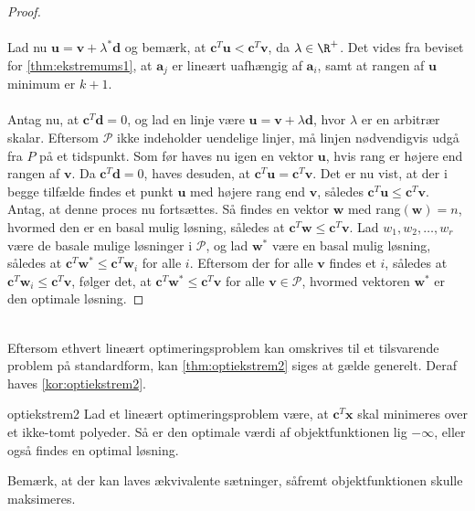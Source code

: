 \begin{proof}
\\\\%
Lad nu $\textbf{u} = \textbf{v} + \lambda^* \textbf{d} $ og bemærk, at $ \textbf{c}^T \textbf{u} < \textbf{c}^T \textbf{v}$, da $ \lambda \in \R^+ $. 
Det vides fra beviset for \ref{thm:ekstremums1}, at $\textbf{a}_j$ er lineært uafhængig af $\textbf{a}_i$, samt at rangen af $\textbf{u}$ minimum er $k + 1$. 
\\\\
%
Antag nu, at $\textbf{c}^T \textbf{d} = 0$, og lad en linje være $\textbf{u} = \textbf{v} + \lambda \textbf{d}$, hvor $ \lambda $ er en arbitrær skalar. 
Eftersom $\mathcal{P}$ ikke indeholder uendelige linjer, må linjen nødvendigvis udgå fra $P$ på et tidspunkt. 
Som før haves nu igen en vektor $\textbf{u}$, hvis rang er højere end rangen af $\textbf{v}$. 
Da $\textbf{c}^T \textbf{d} = 0$, haves desuden, at $\textbf{c}^T \textbf{u} = \textbf{c}^T \textbf{v}$. 
Det er nu vist, at der i begge tilfælde findes et punkt $\textbf{u}$ med højere rang end $\textbf{v}$, således $\textbf{c}^T \textbf{u} \leq \textbf{c}^T \textbf{v}$. 
Antag, at denne proces nu fortsættes.
Så findes en vektor $\textbf{w}$ med rang$(\textbf{w})=n$, hvormed den er en basal mulig løsning, således at $\textbf{c}^T \textbf{w} \leq \textbf{c}^T \textbf{v}$. 
Lad $w_1, w_2, \ldots , w_r$ være de basale mulige løsninger i $\mathcal{P}$, og lad $\textbf{w}^*$ være en basal mulig løsning, således at $\textbf{c}^T \textbf{w}^* \leq \textbf{c}^T \textbf{w}_i$ for alle $i$. 
Eftersom der for alle $\textbf{v}$ findes et $i$, således at $\textbf{c}^T \textbf{w}_i \leq \textbf{c}^T \textbf{v}$, følger det, at $\textbf{c}^T \textbf{w}^* \leq \textbf{c}^T \textbf{v}$ for alle $\textbf{v} \in \mathcal{P}$, hvormed vektoren $\textbf{w}^*$ er den optimale løsning. 
\end{proof}
\\
%
Eftersom ethvert lineært optimeringsproblem kan omskrives til et tilsvarende problem på standardform, kan \ref{thm:optiekstrem2} siges at gælde generelt. 
Deraf haves \ref{kor:optiekstrem2}. 
%
\begin{kor}{}{optiekstrem2}
Lad et lineært optimeringsproblem være, at $\textbf{c}^T \textbf{x}$ skal minimeres over et ikke-tomt polyeder.
Så er den optimale værdi af objektfunktionen lig $- \infty$, eller også findes en optimal løsning. 
\end{kor}
\noindent
%
Bemærk, at der kan laves ækvivalente sætninger, såfremt objektfunktionen skulle maksimeres.